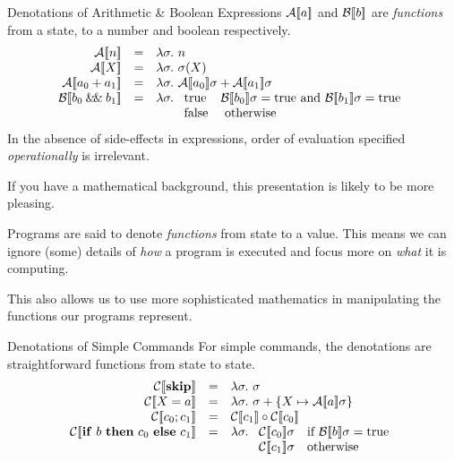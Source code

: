 \begin{frame}{Denotations of Arithmetic \& Boolean Expressions}
    $\mathcal{A} [\![ a ]\!]$ and $\mathcal{B} [\![ b ]\!]$ are \emph{functions} from a state, to a number and
    boolean respectively.
    \pause
    \[\begin{array}{rcl}
        \denA{n} & = & \lambda \sigma.\ n \\
        \denA{X} & = & \lambda \sigma.\ \sigma(X) \\
        \denA{a_0 + a_1} & = & \lambda \sigma.\ \denA{a_0}\sigma + \denA{a_1}\sigma \\
        \denB{b_0 \doubleAmp b_1} & = &
            \lambda \sigma.\ \begin{array}[t]{ll}
                \mathrm{true} & \denB{b_0}\sigma = \mathrm{true} \text{ and } \denB{b_1}\sigma = \mathrm{true} \\
                \mathrm{false} & \text{ otherwise}
            \end{array}
    \end{array}\]
    \pause
    \alert{In the absence of side-effects in expressions, order of evaluation specified \emph{operationally} is irrelevant.}
\end{frame}

If you have a mathematical background, this presentation is likely to be more
pleasing.

Programs are said to denote \emph{functions} from state to a value. This
means we can ignore (some) details of \emph{how} a program is executed and
focus more on \emph{what} it is computing.

This also allows us to use more sophisticated mathematics in manipulating the
functions our programs represent.

\begin{frame}{Denotations of Simple Commands}
    For simple commands, the denotations are straightforward functions from
    state to state.
    \[\begin{array}{rcl}
        \denC{\mathbf{skip}} & = & \lambda \sigma.\ \sigma \\
        \denC{X = a} & = & \lambda \sigma.\ \sigma + \{ X \mapsto \denA{a}\sigma\} \\
        \denC{c_0; c_1} & = & \denC{c_1} \circ \denC{c_0} \\
        \denC{\mathbf{if}\ b\ \mathbf{then}\ c_0\ \mathbf{else}\ c_1} & = &
            \lambda \sigma.\ \begin{array}[t]{ll}
                \denC{c_0}\sigma & \text{if } \denB{b}\sigma = \mathrm{true} \\
                \denC{c_1}\sigma & \text{otherwise}
            \end{array}
    \end{array}\]
\end{frame}

